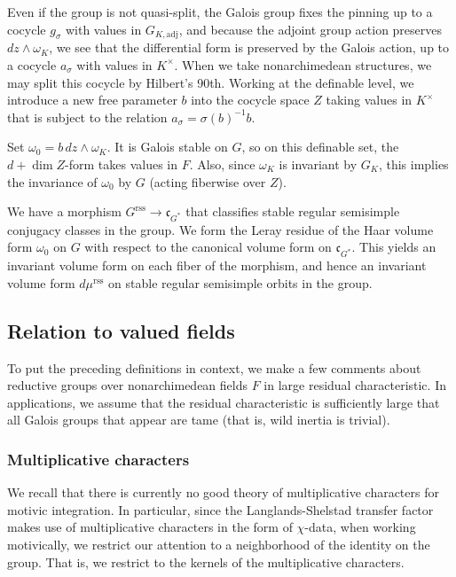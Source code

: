 \documentclass[12pt]{amsart}
\newcommand{\fc}{\mathfrak{c}}
\newcommand{\reg}{\mathrm{rss}}
\theoremstyle{plain}
\theoremstyle{definition}
\begin{document}
Even if the group is not quasi-split, the Galois group fixes the
pinning up to a cocycle $g_\sigma$ with values in $G_{K,\text{adj}}$,
and because the adjoint group action preserves $dz\land \omega_K$, we
see that the differential form is preserved by the Galois action, up
to a cocycle $a_\sigma$ with values in $K^\times$.  When we take
nonarchimedean structures, we may split this cocycle by Hilbert's
90th.  Working at the definable level, we introduce a new free
parameter $b$ into the cocycle space $Z$ taking values in $K^\times$
that is subject to the relation $a_\sigma = \sigma(b)^{-1} b$.

Set $\omega_0 = b\, dz\land\omega_K$.  It is Galois stable on
$G$, so on this definable set, the $d+\dim Z$-form takes values in $F$.
Also, since $\omega_K$ is invariant by $G_K$, this implies the
invariance of $\omega_0$ by $G$ (acting fiberwise over $Z$).  

We have a morphism $G^\reg\to \fc_{G^*}$ that classifies stable
regular semisimple conjugacy classes in the group.  We form the Leray
residue of the Haar volume form $\omega_0$ on $G$ with respect to the
canonical volume form on $\fc_{G^*}$.  This yields an invariant volume
form on each fiber of the morphism, and hence an invariant volume form
$d\mu^\reg$ on stable regular semisimple orbits in the group.

\subsection{Relation to valued fields}

To put the preceding definitions in context, we make a few comments
about reductive groups over nonarchimedean fields $F$ in large
residual characteristic.  In applications, we assume that the residual
characteristic is sufficiently large that all Galois groups that
appear are tame (that is, wild inertia is trivial).

\subsubsection{Multiplicative characters}

We recall that there is currently no good theory of multiplicative
characters for motivic integration.  In particular, since the
Langlands-Shelstad transfer factor makes use of multiplicative
characters in the form of $\chi$-data, when working motivically,
we restrict our attention to a neighborhood of the identity on the
group.  That is, we restrict to the kernels of the multiplicative
characters.
\end{document}
